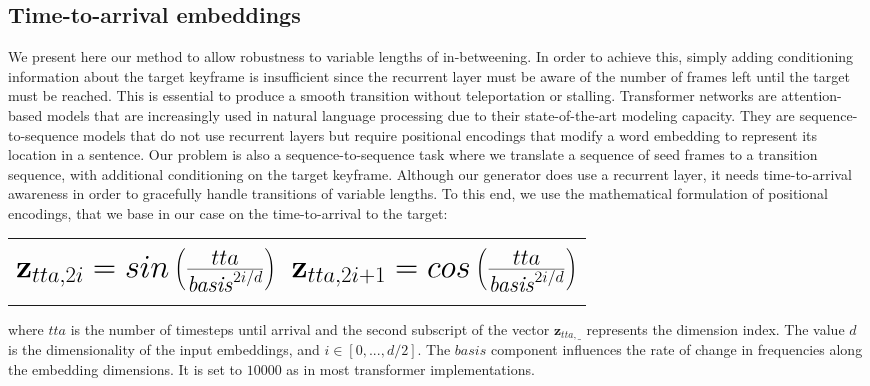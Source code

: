 \documentclass[acmtog]{acmart}
\newcommand{\bz}{\textbf{z}}
\begin{document}
\subsection{Time-to-arrival embeddings}\label{sec:temporal}
We present here our method to allow robustness to variable lengths of in-betweening. In order to achieve this, simply adding conditioning information about the target keyframe is insufficient since the recurrent layer must be aware of the number of frames left until the target must be reached. This is essential to produce a smooth transition without teleportation or stalling. Transformer networks \cite{vaswani2017attention} are attention-based models that are increasingly used in natural language processing due to their state-of-the-art modeling capacity. They are sequence-to-sequence models that do not use recurrent layers but require positional encodings that modify a word embedding to represent its location in a sentence. Our problem is also a sequence-to-sequence task where we translate a sequence of seed frames to a transition sequence, with additional conditioning on the target keyframe. Although our generator does use a recurrent layer, it needs time-to-arrival awareness in order to gracefully handle transitions of variable lengths. To this end, we use the mathematical formulation of positional encodings, that we base in our case on the time-to-arrival to the target:
\vskip -0.25cm
 \begin{table}[h]
     \begin{adjustbox}{width=\columnwidth,center}
         \begin{tabular}{c c}
                \vbox{\begin{equation} \Huge \mbox{\fontsize{23}{0}\selectfont\(
                \bz_{tta, 2i} = sin \left(\frac{tta}{\mathit{basis}^{2i / d}}\right)\)} \end{equation}}
                 & \vbox{\begin{equation}\Huge \mbox{\fontsize{23}{0}\selectfont\(\bz_{tta, 2i+1} = cos\left(\frac{tta}{\mathit{basis}^{2i / d}}\right)\)}\end{equation}}
         \end{tabular}
     \end{adjustbox}
 \end{table}
\vskip -0.25cm
where $\mathit{tta}$ is the number of timesteps until arrival and the second subscript of the vector $\bz_{\mathit{tta}, \_}$ represents the dimension index. The value $d$ is the dimensionality of the input embeddings, and $i \in [0, ..., d/2]$. The $\mathit{basis}$ component influences the rate of change in frequencies along the embedding dimensions. It is set to $\num{10000}$ as in most transformer implementations.
\end{document}
